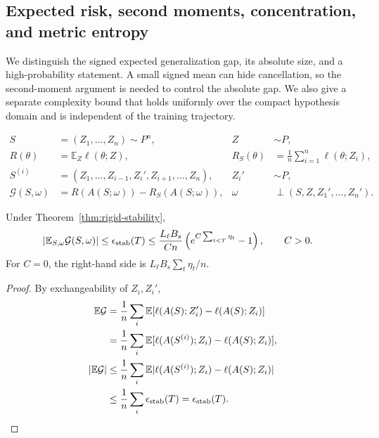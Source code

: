 \subsection{Expected risk, second moments, concentration, and metric entropy}
\label{app:rigid-generalization}
We distinguish the signed expected generalization gap, its absolute size, and a high-probability statement. A small signed mean can hide cancellation, so the second-moment argument is needed to control the absolute gap. We also give a separate complexity bound that holds uniformly over the compact hypothesis domain and is independent of the training trajectory.
\begin{definition}
\begin{align}
 S&=(Z_1,\ldots,Z_n)\sim P^n,&Z&\sim P,\\
 R(\theta)&=\mathbb E_Z\ell(\theta;Z),&
 R_S(\theta)&=\frac1n\sum_{i=1}^n\ell(\theta;Z_i),\\
 S^{(i)}&=(Z_1,\ldots,Z_{i-1},Z_i',Z_{i+1},\ldots,Z_n),&Z_i'&\sim P,\\
 \mathcal G(S,\omega)&=R(A(S;\omega))-R_S(A(S;\omega)),&\omega&\perp(S,Z,Z_1',\ldots,Z_n').
\end{align}
\end{definition}

\begin{theorem}
\label{thm:generalization-new}
Under Theorem~\ref{thm:rigid-stability},
\begin{align}\label{eq:stability-sum-new}
 |\mathbb E_{S,\omega}\mathcal G(S,\omega)|
 &\le\epsilon_{\rm stab}(T)
 \le\frac{L_\ell B_s}{Cn}\left(e^{C\sum_{t<T}\eta_t}-1\right),\qquad C>0.
\end{align}
For $C=0$, the right-hand side is $L_\ell B_s\sum_t\eta_t/n$.
\end{theorem}
\begin{proof}
By exchangeability of $Z_i,Z_i'$,
\begin{align}
 \mathbb E\mathcal G
 &=\frac1n\sum_i\mathbb E[\ell(A(S);Z_i')-\ell(A(S);Z_i)]\\
 &=\frac1n\sum_i\mathbb E[\ell(A(S^{(i)});Z_i)-\ell(A(S);Z_i)],\\
 |\mathbb E\mathcal G|
 &\le\frac1n\sum_i\mathbb E|\ell(A(S^{(i)});Z_i)-\ell(A(S);Z_i)|\\
 &\le\frac1n\sum_i\epsilon_{\rm stab}(T)=\epsilon_{\rm stab}(T).
\end{align}
\end{proof}

